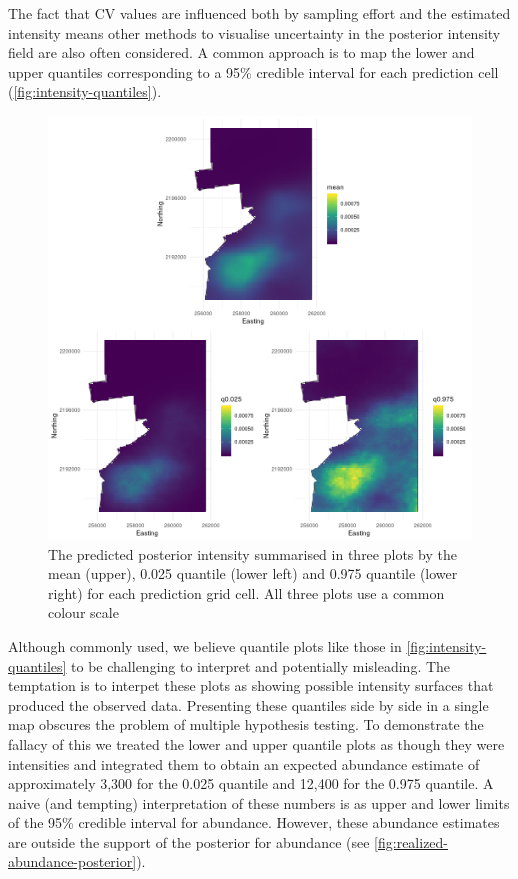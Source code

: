 \documentclass[preprint,12pt]{elsarticle}
\begin{document}
The fact that CV values are influenced both by sampling effort and the estimated intensity means other methods to visualise uncertainty in the posterior intensity field are also often considered. A common approach is to map the lower and upper quantiles corresponding to a 95\% credible interval for each prediction cell (\autoref{fig:intensity-quantiles}).
\begin{figure}
	\includegraphics[scale=0.5]{figures/intensity_quantiles.png}
	\caption{The predicted posterior intensity summarised in three plots by the mean (upper),  0.025 quantile (lower left) and 0.975 quantile (lower right) for each prediction grid cell.  All three plots use a common colour scale}
	\label{fig:intensity-quantiles}
\end{figure}
Although commonly used, we believe quantile plots like those in \autoref{fig:intensity-quantiles} to be challenging to interpret and potentially misleading.  The temptation is to interpet these plots as showing possible intensity surfaces that produced the observed data.  Presenting these quantiles side by side in a single map obscures the problem of multiple hypothesis testing.  To demonstrate the fallacy of this we treated the lower and upper quantile plots as though they were intensities and integrated them to obtain an expected abundance estimate of approximately 3,300 for the 0.025 quantile and 12,400 for the 0.975 quantile.  A naive (and tempting) interpretation of these numbers is as upper and lower limits of the 95\% credible interval for abundance. However, these abundance estimates are outside the support of the posterior for abundance (see \autoref{fig:realized-abundance-posterior}).
\end{document}
